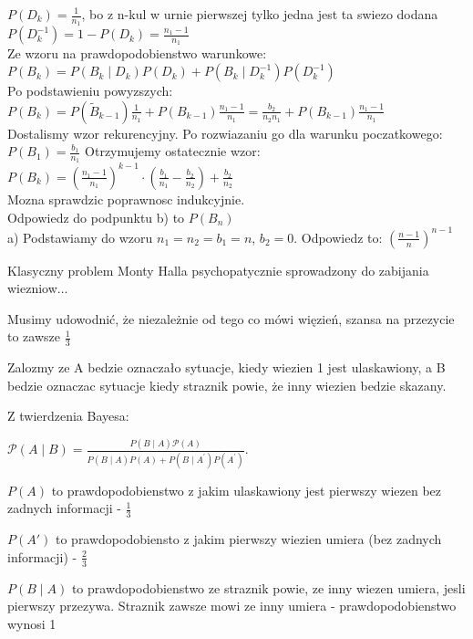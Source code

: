 \documentclass[fleqn]{article}
\def\P{\mathcal{P}}
\begin{document}
$P(D_{k})=\frac{1}{n_{1}}$, bo z n-kul w urnie pierwszej tylko jedna jest ta swiezo dodana\\
$P(D_{k}^{-1})=1-P(D_{k})=\frac{n_{1}-1}{n_{1}}$\\
Ze wzoru na prawdopodobienstwo warunkowe:\\
$P(B_k)=P(B_{k}\mid D_{k})P(D_{k})+P(B_{k}\mid D_{k}^{-1})P(D_{k}^{-1})$\\
Po podstawieniu powyzszych:\\
$P(B_k)=P(\tilde{B}_{k-1})\frac{1}{n_{1}}+P(B_{k-1})\frac{n_{1}-1}{n_{1}}=\frac{b_{2}}{n_{2}n_{1}}+P(B_{k-1})\frac{n_{1}-1}{n_{1}}$\\
Dostalismy wzor rekurencyjny. Po rozwiazaniu go dla warunku poczatkowego: $P(B_{1})=\frac{b_{1}}{n_{1}}$ Otrzymujemy ostatecznie wzor:\\
$P(B_k)=\left ( \frac{n_{1}-1}{n_{1}} \right )^{k-1}\cdot \left ( \frac{b_{1}}{n_{1}}-\frac{b_{2}}{n_{2}} \right )+\frac{b_{2}}{n_{2}}$\\
Mozna sprawdzic poprawnosc indukcyjnie.\\
Odpowiedz do podpunktu b) to $P(B_{n})$
\\
a)
Podstawiamy do wzoru $n_{1}=n_{2}=b_{1}=n$, $b_{2}=0$. Odpowiedz to:
$\left ( \frac{n-1}{n} \right )^{n-1}$

\medskip
{}
\medskip

Klasyczny problem Monty Halla psychopatycznie sprowadzony do zabijania wiezniow...

Musimy udowodnić, że niezależnie od tego co mówi więzień, szansa na przezycie to zawsze $\frac{1}{3}$

Zalozmy ze A bedzie oznaczało sytuacje, kiedy wiezien 1 jest ulaskawiony, a B bedzie oznaczac sytuacje kiedy straznik powie, że inny wiezien bedzie skazany.


Z twierdzenia Bayesa:

$\P(A\mid B)=\frac {P(B\mid A)\P(A)}{P(B\mid A)P(A)+P(B\mid A^{'})P(A^{'})}.$



$P(A)$ to prawdopodobienstwo z jakim ulaskawiony jest pierwszy wiezen bez zadnych informacji - $\frac{1}{3}$

$P(A')$ to prawdopodobiensto z jakim pierwszy wiezien umiera (bez zadnych informacji) - $\frac{2}{3}$

$P(B \mid A)$ to prawdopodobienstwo ze straznik powie, ze inny wiezen umiera, jesli pierwszy przezywa. Straznik zawsze mowi ze inny umiera - prawdopodobienstwo wynosi 1
\end{document}
